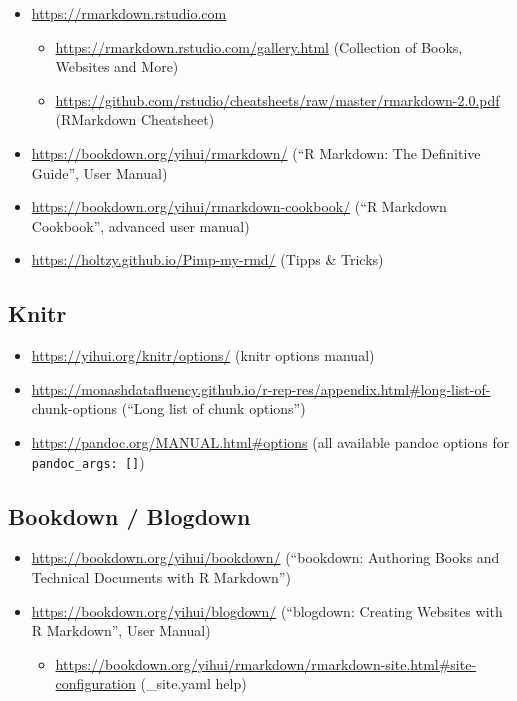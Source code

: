 \documentclass[
]{book}
\providecommand{\tightlist}{%
  \setlength{\itemsep}{0pt}\setlength{\parskip}{0pt}}
\begin{document}
\begin{itemize}
\tightlist
\item
  \url{https://rmarkdown.rstudio.com}

  \begin{itemize}
  \tightlist
  \item
    \url{https://rmarkdown.rstudio.com/gallery.html} (Collection of Books, Websites and More)
  \item
    \url{https://github.com/rstudio/cheatsheets/raw/master/rmarkdown-2.0.pdf} (RMarkdown Cheatsheet)
  \end{itemize}
\item
  \url{https://bookdown.org/yihui/rmarkdown/} (``R Markdown: The Definitive Guide'', User Manual)
\item
  \url{https://bookdown.org/yihui/rmarkdown-cookbook/} (``R Markdown Cookbook'', advanced user manual)
\item
  \url{https://holtzy.github.io/Pimp-my-rmd/} (Tipps \& Tricks)
\end{itemize}

\hypertarget{knitr}{%
\subsection{Knitr}\label{knitr}}

\begin{itemize}
\tightlist
\item
  \url{https://yihui.org/knitr/options/} (knitr options manual)
\item
  \url{https://monashdatafluency.github.io/r-rep-res/appendix.html\#long-list-of-} chunk-options (``Long list of chunk options'')
\item
  \url{https://pandoc.org/MANUAL.html\#options} (all available pandoc options for \texttt{pandoc\_args:\ {[}{]}})
\end{itemize}

\hypertarget{bookdown-blogdown}{%
\subsection{Bookdown / Blogdown}\label{bookdown-blogdown}}

\begin{itemize}
\tightlist
\item
  \url{https://bookdown.org/yihui/bookdown/} (``bookdown: Authoring Books and Technical Documents with R Markdown'')
\item
  \url{https://bookdown.org/yihui/blogdown/} (``blogdown: Creating Websites with R Markdown'', User Manual)

  \begin{itemize}
  \tightlist
  \item
    \url{https://bookdown.org/yihui/rmarkdown/rmarkdown-site.html\#site-configuration} (\_site.yaml help)
  \end{itemize}
\end{itemize}
\end{document}
